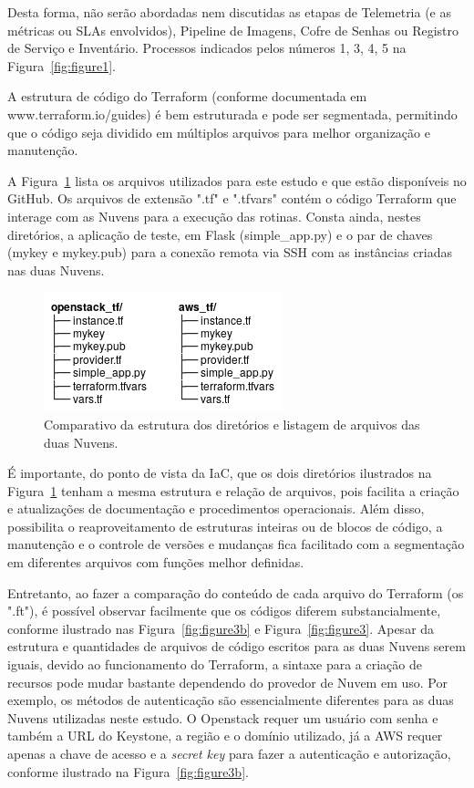 \documentclass[12pt]{article}
\begin{document}
	Desta forma, não serão abordadas nem discutidas as etapas de Telemetria	(e as métricas ou SLAs envolvidos), Pipeline de Imagens, Cofre de Senhas ou Registro de Serviço e Inventário. Processos indicados pelos números 1, 3, 4, 5 na Figura~\ref{fig:figure1}.
	
	A estrutura de código do Terraform (conforme documentada em www.terraform.io/guides) é bem estruturada e pode ser segmentada, permitindo que o código seja dividido em múltiplos arquivos para melhor organização e manutenção. 
	
	A Figura~\ref{fig:figure3a} lista os arquivos utilizados para este estudo e que estão disponíveis no GitHub. Os arquivos de extensão ".tf" e ".tfvars" contém o código Terraform que interage com as Nuvens para a execução das rotinas. Consta ainda, nestes diretórios, a aplicação de teste, em Flask (simple\_app.py) e o par de chaves (mykey e mykey.pub) para a conexão remota via SSH com as instâncias criadas nas duas Nuvens.  
	
	\begin{figure}[ht]
		\centering
		\includegraphics[width=0.42\linewidth]{figuras/Figure3a.png}
		\caption{Comparativo da estrutura dos diretórios e listagem de arquivos das duas Nuvens.}
		\label{fig:figure3a}
	\end{figure}
	
	É importante, do ponto de vista da IaC, que os dois diretórios ilustrados na Figura~\ref{fig:figure3a} tenham a mesma estrutura e relação de arquivos, pois facilita a criação e atualizações de documentação e procedimentos operacionais. Além disso, possibilita o reaproveitamento de estruturas inteiras ou de blocos de código, a manutenção e o controle de versões e mudanças fica facilitado com a segmentação em diferentes arquivos com funções melhor definidas. 
	
	Entretanto, ao fazer a comparação do conteúdo de cada arquivo do Terraform (os ".ft"), é possível observar facilmente que os códigos diferem substancialmente, conforme ilustrado nas Figura~\ref{fig:figure3b} e Figura~\ref{fig:figure3}. Apesar da estrutura e quantidades de arquivos de código escritos para as duas Nuvens serem iguais, devido ao funcionamento do Terraform, a sintaxe para a criação de recursos pode mudar bastante dependendo do provedor de Nuvem em uso. Por exemplo, os métodos de autenticação são essencialmente diferentes para as duas Nuvens utilizadas neste estudo. O Openstack requer um usuário com senha e também a URL do Keystone, a região e o domínio utilizado, já a AWS requer apenas a chave de acesso e a \textit{secret key} para fazer a autenticação e autorização, conforme ilustrado na Figura~\ref{fig:figure3b}. 
		
\end{document}
